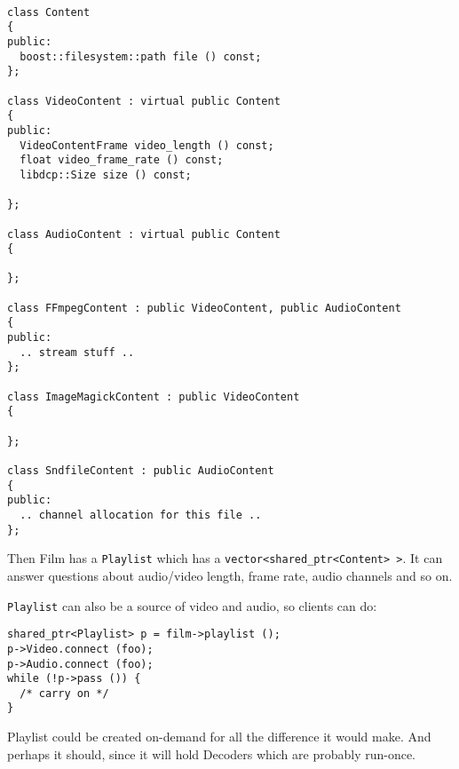 \documentclass{article}
\begin{document}
\begin{verbatim}

class Content
{
public:
  boost::filesystem::path file () const;
};

class VideoContent : virtual public Content
{
public:
  VideoContentFrame video_length () const;
  float video_frame_rate () const;
  libdcp::Size size () const;

};

class AudioContent : virtual public Content
{

};

class FFmpegContent : public VideoContent, public AudioContent
{
public:
  .. stream stuff ..
};

class ImageMagickContent : public VideoContent
{

};

class SndfileContent : public AudioContent
{
public:
  .. channel allocation for this file ..
};
\end{verbatim}

Then Film has a \texttt{Playlist} which has a
\texttt{vector<shared\_ptr<Content> >}.  It can answer questions
about audio/video length, frame rate, audio channels and so on.

\texttt{Playlist} can also be a source of video and audio, so clients can do:

\begin{verbatim}
shared_ptr<Playlist> p = film->playlist ();
p->Video.connect (foo);
p->Audio.connect (foo);
while (!p->pass ()) {
  /* carry on */
}
\end{verbatim}

Playlist could be created on-demand for all the difference it would
make.  And perhaps it should, since it will hold Decoders which are
probably run-once.
\end{document}
